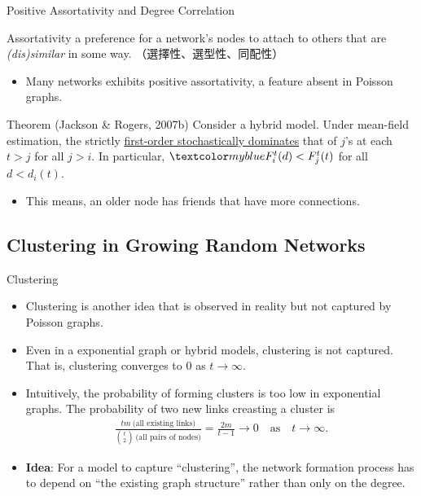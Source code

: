 \documentclass{beamer}
\begin{document}
\begin{frame}{Positive Assortativity and Degree Correlation}
	\begin{block}{Assortativity}
		a preference for a network's nodes to attach to others that are \emph{(dis)similar} in some way.
		（選擇性、選型性、同配性）
	\end{block}
	\begin{itemize}
		\item
			Many networks exhibits positive assortativity,
			a feature absent in Poisson graphs.
	\end{itemize}
	\begin{block}{Theorem (Jackson \& Rogers, 2007b)}
		Consider a hybrid model.
		Under mean-field estimation,
		the  strictly \hyperlink{app:FSD}{first-order stochastically dominates}
		that of $j$'s at each $t>j$ for all $j>i$.
		In particular, $\blue{F^{t}_{i}(d)}<F^{t}_{j}(t)$ for all $d<d_{i}(t)$.
	\end{block}
	\begin{itemize}
		\item
			This means, an older node has friends that have more connections.
	\end{itemize}
\end{frame}

\subsection{Clustering in Growing Random Networks}\label{sec:clustering}

\begin{frame}{Clustering}
	\begin{itemize}
		\item
			Clustering is another idea that is observed in reality but not captured by Poisson graphs.
		\item
			Even in a exponential graph or hybrid models,
			clustering is not captured.
			That is, clustering converges to $0$ as $t\to\infty$.
		\item
			Intuitively, the probability of forming clusters is too low in exponential graphs.
			The probability of two new links creasting a cluster is
			\begin{align*}
				\frac{tm\ \text{(all existing links)}}{{t\choose2}\ \text{(all pairs of nodes)}}
				= \frac{2m}{t-1}
				\to 0
				\quad\text{as}\quad
				t\to\infty.
			\end{align*}
		\item
			\textbf{Idea}: For a model to capture ``clustering'',
			the network formation process has to depend on ``the existing graph structure''
			rather than only on the degree.
	\end{itemize}
\end{frame}
\end{document}
